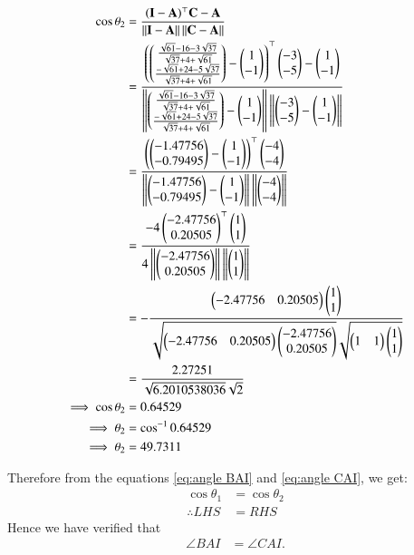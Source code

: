 \documentclass[journal,12pt,twocolumn]{IEEEtran}
\theoremstyle{remark}
\begin{document}
\begin{align}
\cos{\theta_2} &= \frac{(\mathbf{I} - \mathbf{A})^{\top}\mathbf{C} - \mathbf{A}}{\left\lVert\mathbf{I} - \mathbf{A}\right\rVert \left\lVert \mathbf{C} - \mathbf{A}\right\rVert}\\
&= \frac{\left(\begin{pmatrix}\frac{{\sqrt{61}-16-3\sqrt{37}}}{\sqrt{37}+4+\sqrt{61}}\\\frac{{-\sqrt{61}+24-5\sqrt{37}}}{\sqrt{37}+4+\sqrt{61}}\end{pmatrix} - \begin{pmatrix}1\\-1\end{pmatrix}\right)^{\top}\begin{pmatrix}-3\\-5\end{pmatrix} - \begin{pmatrix}1\\-1\end{pmatrix}}{\left\lVert\begin{pmatrix}\frac{{\sqrt{61}-16-3\sqrt{37}}}{\sqrt{37}+4+\sqrt{61}}\\ \frac{{-\sqrt{61}+24-5\sqrt{37}}}{\sqrt{37}+4+\sqrt{61}}\end{pmatrix} - \begin{pmatrix}1\\-1\end{pmatrix}\right\rVert \left\lVert\begin{pmatrix}-3\\-5\end{pmatrix} - \begin{pmatrix}1\\-1\end{pmatrix}\right\rVert}\\
&= \frac{\left(\begin{pmatrix}-1.47756\\-0.79495\end{pmatrix} - \begin{pmatrix}1\\-1\end{pmatrix}\right)^{\top}\begin{pmatrix}-4\\-4\end{pmatrix}}{\left\lVert\begin{pmatrix}-1.47756\\-0.79495\end{pmatrix} - \begin{pmatrix}1\\-1\end{pmatrix}\right\rVert \left\lVert \begin{pmatrix}-4\\-4\end{pmatrix}\right\rVert}\\
&= \frac{-4\begin{pmatrix}-2.47756\\0.20505\end{pmatrix}^{\top}\begin{pmatrix}1\\1\end{pmatrix}}{4\left\lVert\begin{pmatrix}-2.47756\\0.20505\end{pmatrix}\right\rVert \left\lVert \begin{pmatrix}1\\1\end{pmatrix}\right\rVert}\\
&= -\frac{\begin{pmatrix}-2.47756&0.20505\end{pmatrix}\begin{pmatrix}1\\1\end{pmatrix}}{\sqrt{\begin{pmatrix}-2.47756&0.20505\end{pmatrix}\begin{pmatrix}-2.47756\\0.20505\end{pmatrix}}\sqrt{\begin{pmatrix}1&1\end{pmatrix}\begin{pmatrix}1\\1\end{pmatrix}}}\\
&= \frac{2.27251}{\sqrt{6.2010538036}\sqrt{2}}\\
\implies \cos{\theta_2} &= 0.64529 \\
\implies \theta_2 &= \cos^{-1}{0.64529}\\
\implies\theta_2 &= 49.7311 \label{eq:angle CAI}
\end{align}

Therefore from the equations \eqref{eq:angle BAI} and \eqref{eq:angle CAI}, we get:
\begin{align}
\cos{\theta_1} &= \cos{\theta_2}\\
\therefore LHS &= RHS
\end{align}
Hence we have verified that \begin{align}\angle BAI &= \angle CAI.\end{align}
\end{document}
